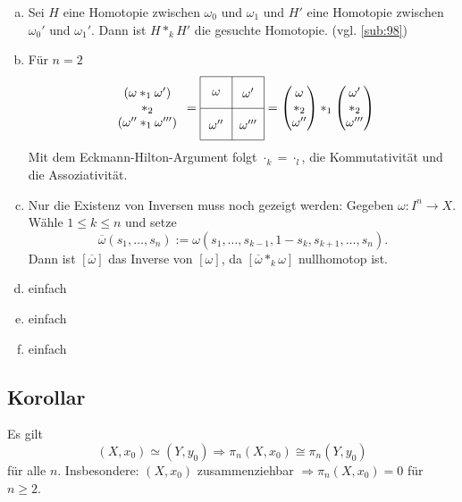 \begin{enumerate}[a)]
	\item Sei $H$ eine Homotopie zwischen $\omega_0$ und $\omega_1$ und $H'$ eine Homotopie zwischen $\omega_0'$ und $\omega_1'$. Dann ist $H *_k H'$ die gesuchte 
	Homotopie. \hfill (vgl. \ref{sub:98})
	\item Für $n=2$
	\[
		\begin{array}{c}
			(\omega *_1 \omega') \\
			*_2 \\
			(\omega'' *_1 \omega''')
			
		\end{array}
		 = 
		\vcenter{\hbox{\begin{tikzpicture}[scale=0.9]
			\draw (0,0) grid (2,2);
			\node at (0.5,0.5){$\omega''$};
			\node at (0.5,1.5){$\omega$};
			\node at (1.5,0.5){$\omega'''$};
			\node at (1.5,1.5){$\omega'$};
		\end{tikzpicture}}}
		 = \begin{pmatrix}
		 	\omega \\
			*_2 \\
			\omega''
		 \end{pmatrix} *_1
		 \begin{pmatrix}
		 	\omega' \\
			*_2 \\
			\omega'''
		 \end{pmatrix}
	\]
	Mit dem Eckmann-Hilton-Argument folgt $\cdot_k = \cdot_l$, die Kommutativität und die Assoziativität.
	\item Nur die Existenz von Inversen muss noch gezeigt werden:
	Gegeben $\omega : I^n \to X$. Wähle $1 \le k \le n$ und setze
	\[
		\overline{\omega} (s_1, \ldots , s_n) := \omega (s_1, \ldots , s_{k-1} ,1- s_k , s_{k+1}, \ldots , s_n). 
	\]
	Dann ist $[\overline{\omega}]$ das Inverse von $[\omega]$, da $[\overline{\omega} *_k \omega ]$ nullhomotop ist.
	\item einfach
	\item einfach
	\item einfach \bewende
\end{enumerate}

\subsection[Korollar: Die Homotopiegruppen homöomorpher punktierter Räume stimmen überein]{Korollar} %
\label{sub:147}
Es gilt 
\[
	(X,x_0) \simeq (Y,y_0) \Longrightarrow \pi_n(X,x_0) \cong \pi_n(Y,y_0)
\]
für alle $n$. Insbesondere: $(X,x_0)$ zusammenziehbar $\Rightarrow \pi_n(X,x_0) = 0$ für $n \ge 2$.

